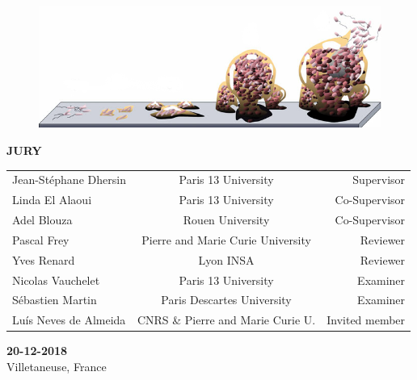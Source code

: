 \documentclass[12pt,a4paper]{article}
\begin{document}
\begin{titlepage}


\begin{center}
  \begin{figure}[h]
  \begin{center}
  \includegraphics[width=0.8\linewidth]{biofilm}
  \end{center}
  \end{figure}
\end{center}
%

\begin{center}
\normalsize\sffamily
\textbf{JURY}
\end{center}

\vspace{-0.2cm}

\begin{table}[hb!]
\sffamily
\centering
\begin{tabular}{lcr}
Jean-Stéphane Dhersin & Paris 13 University & Supervisor \\
Linda El Alaoui & Paris 13 University & Co-Supervisor \\
Adel Blouza & Rouen University & Co-Supervisor \\
Pascal Frey & Pierre and Marie Curie University & Reviewer \\
Yves Renard & Lyon INSA & Reviewer \\
Nicolas Vauchelet & Paris 13 University & Examiner \\
Sébastien Martin & Paris Descartes University & Examiner\\
Luís Neves de Almeida & CNRS \& Pierre and Marie Curie U. & Invited member
\end{tabular}
\end{table}


\begin{center}
\sffamily
\textbf{20-12-2018} \\
Villetaneuse, France
\end{center}


\end{titlepage}
\end{document}

